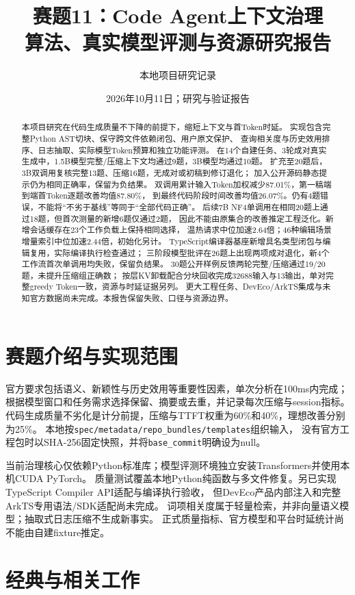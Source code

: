 \documentclass[UTF8,a4paper,11pt,fontset=fandol]{ctexart}
\title{赛题11：Code Agent上下文治理\\算法、真实模型评测与资源研究报告}
\author{本地项目研究记录}
\date{2026年10月11日；研究与验证报告}
\begin{document}
\maketitle
\begin{abstract}
本项目研究在代码生成质量不下降的前提下，缩短上下文与首Token时延。
实现包含完整Python AST切块、保守跨文件依赖闭包、用户原文保护、
查询相关度与历史效用排序、日志抽取、实际模型Token预算和独立功能评测。
在14个自建任务、3轮成对真实生成中，1.5B模型完整/压缩上下文均通过9题，3B模型均通过10题。
扩充至20题后，3B双调用复核完整13题、压缩16题，无成对或初稿到修订退化；
加入公开源码静态提示仍为相同正确率，保留为负结果。
双调用累计输入Token加权减少87.01\%，第一稿端到端首Token逐题改善均值87.80\%，
到最终代码阶段时间改善均值26.07\%。仍有4题错误，不能将“不劣于基线”等同于“全部代码正确”。
后续7B NF4单调用在相同20题上通过18题，但首次测量的新增6题仅通过2题，
因此不能由原集合的改善推定工程泛化。新增会话缓存在23个工作负载上保持相同选择，
温热请求中位加速2.64倍；46种编辑场景增量索引中位加速2.44倍，初始化另计。
TypeScript编译器基座新增具名类型闭包与编辑复用，实际编译执行检查通过；
三阶段模型批评在26题上出现两项成对退化，新4个工作流首次单调用均失败，保留负结果。
30题公开样例反馈两轮完整/压缩通过19/20题，未提升压缩组正确数；
按层KV卸载配合分块回收完成32688输入与13输出，单对完整greedy Token一致，资源与时延证据另列。
更大工程任务、DevEco/ArkTS集成与未知官方数据尚未完成。本报告保留失败、口径与资源边界。
\end{abstract}

\section{赛题介绍与实现范围}
官方要求\cite{official}包括语义、新颖性与历史效用等重要性因素，单次分析在100ms内完成；
根据模型窗口和任务需求选择保留、摘要或去重，并记录每次压缩与session指标。
代码生成质量不劣化是计分前提，压缩与TTFT权重为60\%和40\%，理想改善分别为25\%。
本地按\texttt{spec/metadata/repo\_bundles/templates}组织输入，
没有官方工程包时以SHA-256固定快照，并将\texttt{base\_commit}明确设为null。

当前治理核心仅依赖Python标准库；模型评测环境独立安装Transformers并使用本机CUDA PyTorch。
质量测试覆盖本地Python纯函数与多文件修复。另已实现TypeScript Compiler API适配与编译执行验收，
但DevEco产品内部注入和完整ArkTS专用语法/SDK适配尚未完成。
词项相关度属于轻量检索，并非向量语义模型；抽取式日志压缩不生成新事实。
正式质量指标、官方模型和平台时延统计尚不能由自建fixture推定。

\section{经典与相关工作}
\end{document}
